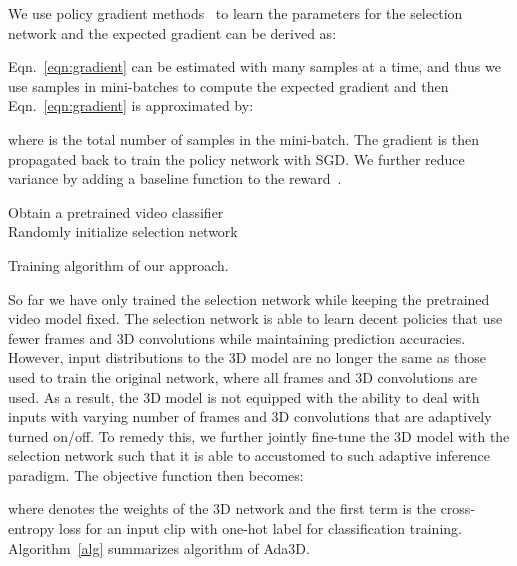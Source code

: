 \documentclass[final]{cvpr}
\newcommand{\system}{{Ada3D}\xspace}
\begin{document}
We use policy gradient methods~\cite{policygradient} to learn the parameters  for the selection network and the expected gradient can be derived as:

Eqn.~\ref{eqn:gradient} can be estimated with many samples at a time, and thus we use samples in mini-batches to compute the expected gradient and then Eqn.~\ref{eqn:gradient}  is approximated by:

where  is the total number of samples in the mini-batch. The gradient is then propagated back to train the policy network with SGD. We further reduce variance by adding a baseline function to the reward~\cite{policygradient}.

\begin{algorithm}[!t]
\DontPrintSemicolon
\SetAlgoLined
{}
Obtain a pretrained video classifier  \\
Randomly initialize selection network  \\
\caption{Training algorithm of our approach.}
\label{alg}
\end{algorithm}
 
So far we have only trained the selection network while keeping the pretrained video model fixed. The selection network is able to learn decent policies that use fewer frames and 3D convolutions while maintaining prediction accuracies. However, input distributions to the 3D model are no longer the same as those used to train the original network, where all frames and 3D convolutions are used. As a result, the 3D model is not equipped with the ability to deal with inputs with varying number of frames and 3D convolutions that are adaptively turned on/off. To remedy this, we further jointly fine-tune the 3D model with the selection network such that it is able to accustomed to such adaptive inference paradigm. The objective function then becomes:

where  denotes the weights of the 3D network  and the first term is the cross-entropy loss for an input clip  with one-hot label  for classification training. 
Algorithm~\ref{alg} summarizes algorithm of \system.
\end{document}
